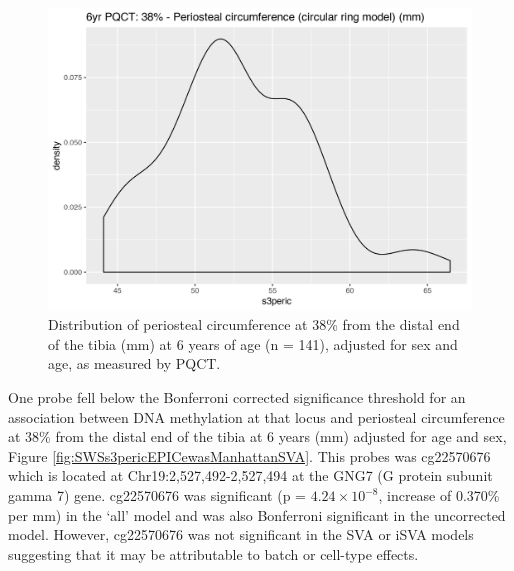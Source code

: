 \documentclass[
]{book}
\begin{document}
\begin{figure}

{\centering \includegraphics[width=0.8\linewidth]{figs/SWSs3peric} 

}

\caption{Distribution of periosteal circumference at 38\% from the distal end of the tibia (mm) at 6 years of age (n = 141), adjusted for sex and age, as measured by PQCT.}\label{fig:SWSs3peric}
\end{figure}



One probe fell below the Bonferroni corrected significance threshold for an association between DNA methylation at that locus and periosteal circumference at 38\% from the distal end of the tibia at 6 years (mm) adjusted for age and sex, Figure \ref{fig:SWSs3pericEPICewasManhattanSVA}. This probes was cg22570676 which is located at Chr19:2,527,492-2,527,494 at the GNG7 (G protein subunit gamma 7) gene. cg22570676 was significant (p = \(4.24\times 10^{-8}\), increase of 0.370\% per mm) in the `all' model and was also Bonferroni significant in the uncorrected model. However, cg22570676 was not significant in the SVA or iSVA models suggesting that it may be attributable to batch or cell-type effects.
\end{document}
